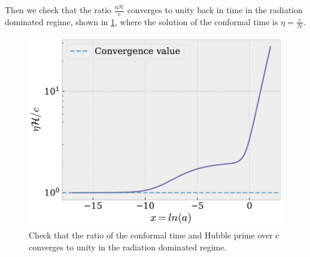 \documentclass[10pt,a4paper]{article}
\begin{document}
\begin{appendices}
Then we check that the ratio $\frac{\eta \mathcal{H}}{c}$ converges to unity back in time in the radiation dominated regime, shown in \cref{fig:bench_eta_rad_dom_converges}, where the solution of the conformal time is $\eta = \frac{c}{\mathcal{H}}$.

\begin{figure}[b]
    \centering
    \includegraphics[scale=0.5]{../figs/ratio_eta_Hp_over_c.pdf}
    \caption{Check that the ratio of the conformal time and Hubble prime over c converges to unity in the radiation dominated regime.}
    \label{fig:bench_eta_rad_dom_converges}
\end{figure}

\end{appendices}
\end{document}
